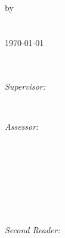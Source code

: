 \begin{titlepage}
by\\[0.2cm]
\textsc{\Large {}}\\[0.2cm]
\\[1cm]



{\Large \today}\\[1cm]

\\
\\[1cm]

\begin{minipage}[t]{0.4\textwidth}
\begin{flushleft} \large
\emph{Supervisor:} \\
\end{flushleft}
\end{minipage}
~
\begin{minipage}[t]{0.4\textwidth}
\begin{flushright} \large
\emph{Assessor:} \\
\\
\end{flushright}
\end{minipage}\\[2cm]
~
\begin{minipage}[t]{0.4\textwidth}
\begin{flushleft} \large
\emph{} \\
\red{}
\end{flushleft}
\end{minipage}
~
\begin{minipage}[t]{0.4\textwidth}
\begin{flushright} \large
\emph{Second Reader:} \\
\\
\end{flushright}
\end{minipage}\\[2cm]
    


\end{titlepage}
